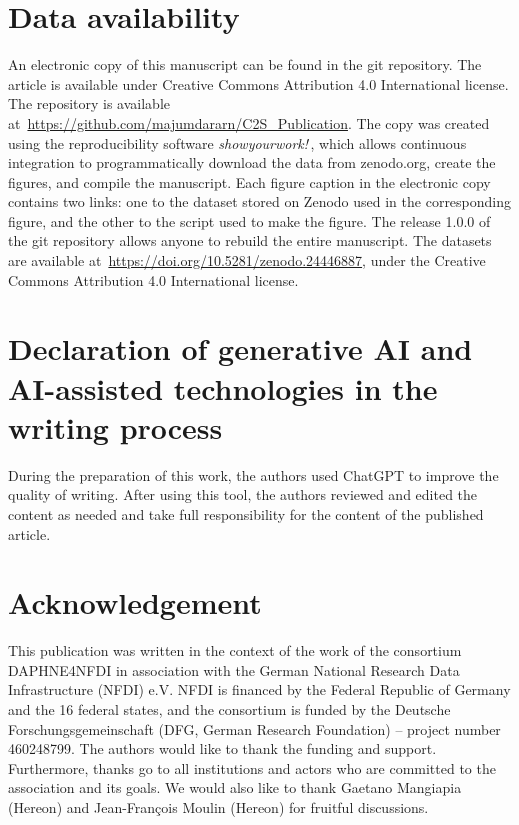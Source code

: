 \documentclass[preprint, 5p, times, twocolumn]{elsarticle}
\begin{document}
\section*{Data availability}

An electronic copy of this manuscript can be found in the git repository. The article is available under Creative Commons Attribution 4.0 International license. The repository is available at~\url{https://github.com/majumdararn/C2S_Publication}. The copy was created using the reproducibility software \emph{showyourwork!}\,\cite{luger2021mapping}, which allows continuous integration to programmatically download the data from zenodo.org, create the figures, and compile the manuscript. Each figure caption in the electronic copy contains two links: one to the dataset stored on Zenodo used in the corresponding figure, and the other to the script used to make the figure. The release 1.0.0 of the git repository allows anyone to rebuild the entire manuscript. The datasets are available at~\url{https://doi.org/10.5281/zenodo.24446887}, under the Creative Commons Attribution 4.0 International license.

\section*{Declaration of generative AI and AI-assisted technologies in the writing process}

During the preparation of this work, the authors used ChatGPT to improve the quality of writing. After using this tool, the authors reviewed and edited the content as needed and take full responsibility for the content of the published article.

\section*{Acknowledgement}

This publication was written in the context of the work of the consortium DAPHNE4NFDI in association with the German National Research Data Infrastructure (NFDI) e.V. NFDI is financed by the Federal Republic of Germany and the 16 federal states, and the consortium is funded by the Deutsche Forschungsgemeinschaft (DFG, German Research Foundation) -- project number 460248799. The authors would like to thank the funding and support. Furthermore, thanks go to all institutions and actors who are committed to the association and its goals. We would also like to thank Gaetano Mangiapia (Hereon) and Jean-Fran{\c{c}}ois Moulin (Hereon) for fruitful discussions.
\end{document}
